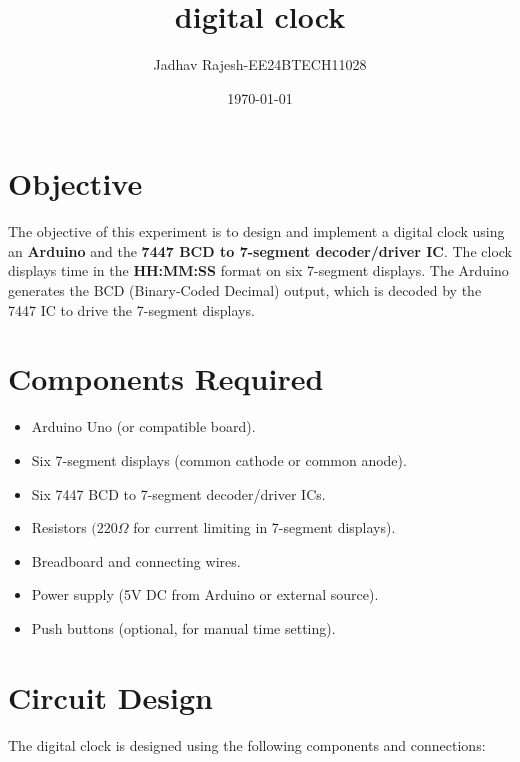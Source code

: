 \documentclass[journal]{IEEEtran}
\title{digital clock}
\author{Jadhav Rajesh-EE24BTECH11028}
\date{\today}
\begin{document}
\maketitle

\section{Objective}
The objective of this experiment is to design and implement a digital clock using an \textbf{Arduino} and the \textbf{7447 BCD to 7-segment decoder/driver IC}. The clock displays time in the \textbf{HH:MM:SS} format on six 7-segment displays. The Arduino generates the BCD (Binary-Coded Decimal) output, which is decoded by the 7447 IC to drive the 7-segment displays.

\section{Components Required}
\begin{itemize}
    \item Arduino Uno (or compatible board).
    \item Six 7-segment displays (common cathode or common anode).
    \item Six 7447 BCD to 7-segment decoder/driver ICs.
    \item Resistors $(220\Omega$ for current limiting in 7-segment displays).
    \item Breadboard and connecting wires.
    \item Power supply (5V DC from Arduino or external source).
    \item Push buttons (optional, for manual time setting).
\end{itemize}

\section{Circuit Design}
The digital clock is designed using the following components and connections:
\end{document}
